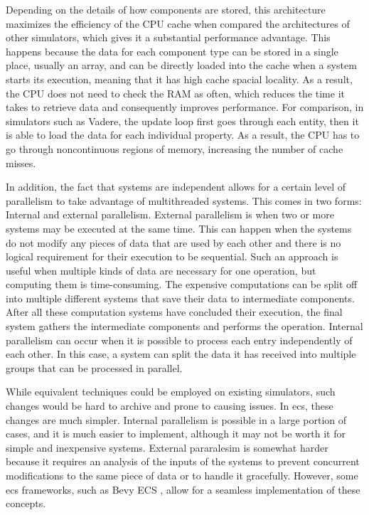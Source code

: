 \documentclass[twoside, 11pt]{article}
\begin{document}
Depending on the details of how components are stored, this architecture maximizes the efficiency of the CPU cache when compared the architectures of other simulators, which gives it a substantial performance advantage. This happens because the data for each component type can be stored in a single place, usually an array, and can be directly loaded into the cache when a system starts its execution, meaning that it has high cache spacial locality. As a result, the CPU does not need to check the RAM as often, which reduces the time it takes to retrieve data and consequently improves performance. For comparison, in simulators such as Vadere, the update loop first goes through each entity, then it is able to load the data for each individual property. As a result, the CPU has to go through noncontinuous regions of memory, increasing the number of cache misses.

In addition, the fact that systems are independent allows for a certain level of parallelism to take advantage of multithreaded systems. This comes in two forms: Internal and external parallelism. External parallelism is when two or more systems may be executed at the same time. This can happen when the systems do not modify any pieces of data that are used by each other and there is no logical requirement for their execution to be sequential. Such an approach is useful when multiple kinds of data are necessary for one operation, but computing them is time-consuming. The expensive computations can be split off into multiple different systems that save their data to intermediate components. After all these computation systems have concluded their execution, the final system gathers the intermediate components and performs the operation. Internal parallelism can occur when it is possible to process each entry independently of each other. In this case, a system can split the data it has received into multiple groups that can be processed in parallel.

While equivalent techniques could be employed on existing simulators, such changes would be hard to archive and prone to causing issues. In \gls{ecs}, these changes are much simpler. Internal parallelism is possible in a large portion of cases, and it is much easier to implement, although it may not be worth it for simple and inexpensive systems. External pararalesim is somewhat harder because it requires an analysis of the inputs of the systems to prevent concurrent modifications to the same piece of data or to handle it gracefully. However, some \gls{ecs} frameworks, such as Bevy ECS \cite{bevy}, allow for a seamless implementation of these concepts.
\end{document}
